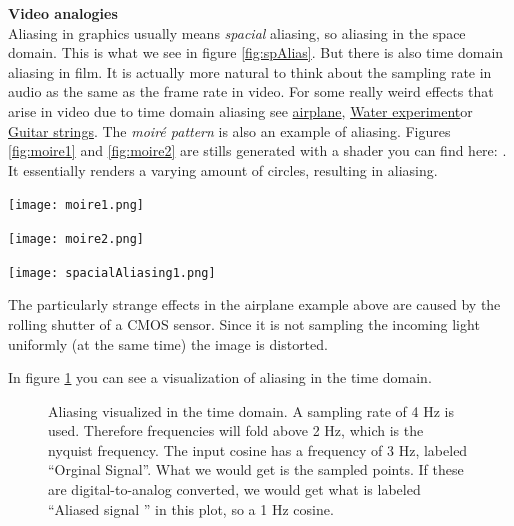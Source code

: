 \begin{framed}
	\textbf{Video analogies}\\
	Aliasing in graphics usually means \textit{spacial} aliasing, so aliasing in the space domain. This is what we see in figure \ref{fig:spAlias}. But there is also time domain aliasing in film. It is actually more natural to think about the sampling rate in audio as the same as the frame rate in video. For some really weird effects that arise in video due to time domain aliasing see \href{https://www.youtube.com/watch?v=LVwmtwZLG88}{airplane}\footnotemark , \href{https://www.youtube.com/watch?v=GBtHeR-hY9Y}{Water experiment}\footnotemark or \href{https://www.youtube.com/watch?v=jcOKTTnOIV8}{Guitar strings}\footnotemark .
	The \textit{moiré pattern} is also an example of aliasing. Figures \ref{fig:moire1} and \ref{fig:moire2} are stills generated with a shader you can find here: . It essentially renders a varying amount of circles, resulting in aliasing. 

	\begin{center}
		\texttt{[image: moire1.png]}
		\label{fig:moire1}
	\end{center}
	\begin{center}
		\texttt{[image: moire2.png]}
		\label{fig:moire2}
	\end{center}

	\begin{center}
		\texttt{[image: spacialAliasing1.png]}
		\label{fig:spAlias}
	\end{center}
	The particularly strange effects in the airplane example above are caused by the rolling shutter of a CMOS sensor. Since it is not sampling the incoming light uniformly (at the same time) the image is distorted.
\end{framed}


In figure \ref{fig:cosAlias} you can see a visualization of aliasing in the time domain.

\begin{figure}[H]
	\centering
	
	\caption[Aliasing]
	{Aliasing visualized in the time domain. A sampling rate of 4 Hz is used. Therefore frequencies will fold above 2 Hz, which is the nyquist frequency. The input cosine has a frequency of 3 Hz, labeled ``Orginal Signal''. What we would get is the sampled points. If these are digital-to-analog converted, we would get what is labeled ``Aliased signal '' in this plot, so a 1 Hz cosine.}
	\label{fig:cosAlias}
\end{figure}



